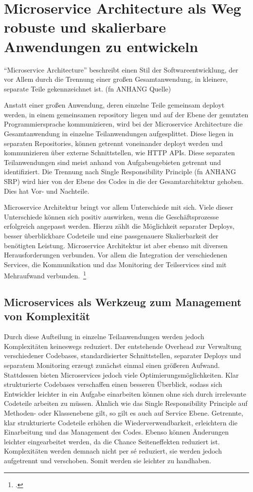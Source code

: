 \chapter{Microservice Architecture als Weg robuste und skalierbare Anwendungen zu entwickeln}
``Microservice Architecture'' beschreibt einen Stil der Softwareentwicklung, der vor Allem durch die Trennung einer großen Gesamtanwendung, in kleinere, separate Teile gekennzeichnet ist. (fn ANHANG Quelle)

Anstatt einer großen Anwendung, deren einzelne Teile gemeinsam deployt werden, in einem gemeinsamen repository liegen und auf der Ebene der genutzten Programmiersprache kommunizieren, wird bei der Microservice Architecture die Gesamtanwendung in einzelne Teilanwendungen aufgesplittet. Diese liegen in separaten Repositories, können getrennt voneinander deployt werden und kommunizieren über externe Schnittstellen, wie HTTP APIs. Diese separaten Teilanwendungen sind meist anhand von Aufgabengebieten getrennt und identifiziert. Die Trennung nach Single Responsibility Principle (fn ANHANG SRP) wird hier von der Ebene des Codes in die der Gesamtarchitektur gehoben. Dies hat Vor- und Nachteile.

Microservice Architektur bringt vor allem Unterschiede mit sich. Viele dieser Unterschiede können sich positiv auswirken, wenn die Geschäftsprozesse erfolgreich angepasst werden. Hierzu zählt die Möglichkeit separater Deploys, besser überblickbare Codeteile und eine passgenauere Skalierbarkeit der benötigten Leistung. Microservice Architektur ist aber ebenso mit diversen Herausforderungen verbunden. Vor allem die Integration der verschiedenen Services, die Kommunikation und das Monitoring der Teilservices sind mit Mehraufwand verbunden.~\footcite[vergleich][]{feathers2004working}

\section{Microservices als Werkzeug zum Management von Komplexität}
Durch diese Aufteilung in einzelne Teilanwendungen werden jedoch Komplexitäten keineswegs reduziert. Der entstehende Overhead zur Verwaltung verschiedener Codebases, standardisierter Schnittstellen, separater Deploys und separatem Monitoring erzeugt zunächst einmal einen größeren Aufwand. Stattdessen bieten Microservices jedoch viele Optimierungsmöglichkeiten. Klar strukturierte Codebases verschaffen einen besseren Überblick, sodass sich Entwickler leichter in ein Aufgabe einarbeiten können ohne sich durch irrelevante Codeteile arbeiten zu müssen. Ähnlich wie das Single Responsibility Principle auf Methoden- oder Klassenebene gilt, so gilt es auch auf Service Ebene. Getrennte, klar strukturierte Codeteile erhöhen die Wiederverwendbarkeit, erleichtern die Einarbeitung und das Management des Codes. Ebenso können Änderungen leichter eingearbeitet werden, da die Chance Seiteneffekten reduziert ist. Komplexitäten werden demnach nicht per sé reduziert, sie werden jedoch aufgetrennt und verschoben. Somit werden sie leichter zu handhaben.

